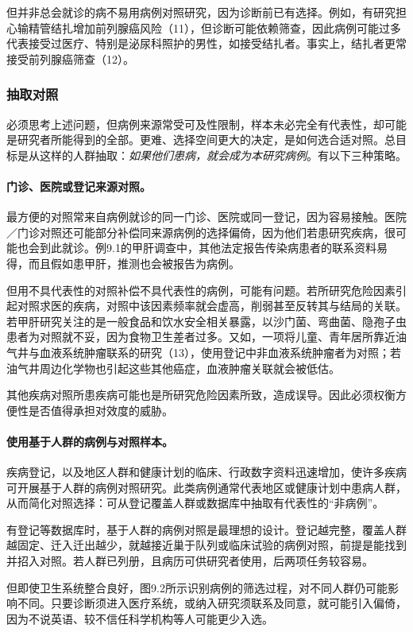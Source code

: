 但并非总会就诊的病不易用病例对照研究，因为诊断前已有选择。例如，有研究担心输精管结扎增加前列腺癌风险（11），但诊断可能依赖筛查，因此病例可能过多代表接受过医疗、特别是泌尿科照护的男性，如接受结扎者。事实上，结扎者更常接受前列腺癌筛查（12）。

\subsubsection{抽取对照}
必须思考上述问题，但病例来源常受可及性限制，样本未必完全有代表性，却可能是研究者所能得到的全部。更难、选择空间更大的决定，是如何选合适对照。总目标是从这样的人群抽取：\emph{如果他们患病，就会成为本研究病例}。有以下三种策略。

\paragraph{门诊、医院或登记来源对照。}最方便的对照常来自病例就诊的同一门诊、医院或同一登记，因为容易接触。医院／门诊对照还可能部分补偿同来源病例的选择偏倚，因为他们若患研究疾病，很可能也会到此就诊。例9.1的甲肝调查中，其他法定报告传染病患者的联系资料易得，而且假如患甲肝，推测也会被报告为病例。

但用不具代表性的对照补偿不具代表性的病例，可能有问题。若所研究危险因素引起对照求医的疾病，对照中该因素频率就会虚高，削弱甚至反转其与结局的关联。若甲肝研究关注的是一般食品和饮水安全相关暴露，以沙门菌、弯曲菌、隐孢子虫患者为对照就不妥，因为食物卫生差者过多。又如，一项将儿童、青年居所靠近油气井与血液系统肿瘤联系的研究（13），使用登记中非血液系统肿瘤者为对照；若油气井周边化学物也引起这些其他癌症，血液肿瘤关联就会被低估。

其他疾病对照所患疾病可能也是所研究危险因素所致，造成误导。因此必须权衡方便性是否值得承担对效度的威胁。

\paragraph{使用基于人群的病例与对照样本。}疾病登记，以及地区人群和健康计划的临床、行政数字资料迅速增加，使许多疾病可开展基于人群的病例对照研究。此类病例通常代表地区或健康计划中患病人群，从而简化对照选择：可从登记覆盖人群或数据库中抽取有代表性的“非病例”。

有登记等数据库时，基于人群的病例对照是最理想的设计。登记越完整，覆盖人群越固定、迁入迁出越少，就越接近巢于队列或临床试验的病例对照，前提是能找到并招入对照。若人群已列册，且病历可供研究者使用，后两项任务较容易。

但即使卫生系统整合良好，图9.2所示识别病例的筛选过程，对不同人群仍可能影响不同。只要诊断须进入医疗系统，或纳入研究须联系及同意，就可能引入偏倚，因为不说英语、较不信任科学机构等人可能更少入选。

